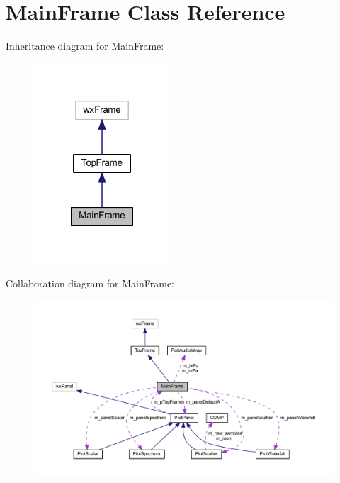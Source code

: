 \hypertarget{class_main_frame}{\section{Main\-Frame Class Reference}
\label{class_main_frame}
}


Inheritance diagram for Main\-Frame\-:\nopagebreak
\begin{figure}[H]
\begin{center}
\leavevmode
\includegraphics[width=144pt]{class_main_frame__inherit__graph}
\end{center}
\end{figure}


Collaboration diagram for Main\-Frame\-:\nopagebreak
\begin{figure}[H]
\begin{center}
\leavevmode
\includegraphics[width=350pt]{class_main_frame__coll__graph}
\end{center}
\end{figure}
